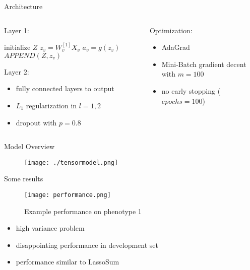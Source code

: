\documentclass{beamer}
\begin{document}
\begin{frame}[t]{Architecture}
  \begin{columns}[t]
    \begin{column}{0.5\textwidth}
      Layer 1:
      \begin{algorithmic}
        \STATE initialize $Z$
        \STATE $z_v = W^{[1]}_vX_v$
        \STATE $a_v = g(z_v)$
        \STATE $APPEND(Z, z_v)$
        \ENDFOR
      \end{algorithmic}
      Layer $2$:\\
      \begin{itemize}
        \item fully connected layers to output
        \item $L_1$ regularization in $l=1,2$
        \item dropout with $p=0.8$
      \end{itemize}
    \end{column}
    \begin{column}{0.5\textwidth}
      Optimization:
      \begin{itemize}
        \item AdaGrad
        \item Mini-Batch gradient decent with $m=100$
        \item no early stopping ($epochs=100$)
      \end{itemize}
    \end{column}
  \end{columns}
\end{frame}

\begin{frame}[t]{Model Overview}
  \begin{figure}[htpb]
    \centering
    \texttt{[image: ./tensormodel.png]}
  \end{figure}
\end{frame}

\begin{frame}[t]{Some results}
  \begin{figure}[htpb]
    \centering
    \texttt{[image: performance.png]}
    \caption{Example performance on phenotype 1}
  \end{figure}
  \begin{itemize}
    \item high variance problem
    \item disappointing performance in development set
    \item performance similar to LassoSum
  \end{itemize}
\end{frame}
\end{document}
